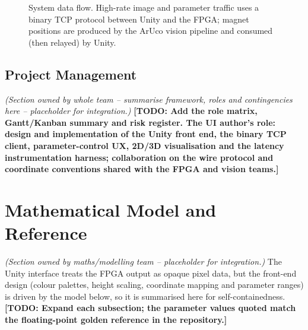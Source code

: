 \documentclass[11pt,a4paper]{article}
\newcommand{\todo}[1]{\textcolor{red!75!black}{\textbf{[TODO: #1]}}}
\newcommand{\owned}[1]{\textit{\small(Section owned by #1 -- placeholder for integration.)}}
\begin{document}
\begin{figure}[t]
\centering
{}
\caption{System data flow. High-rate image and parameter traffic uses a binary
TCP protocol between Unity and the FPGA; magnet positions are produced by the
ArUco vision pipeline and consumed (then relayed) by Unity.}
\label{fig:dataflow}
\end{figure}

\subsection{Project Management}
\owned{whole team -- summarise framework, roles and contingencies here}
\todo{Add the role matrix, Gantt/Kanban summary and risk register. The
UI author's role: design and implementation of the Unity front end, the
binary TCP client, parameter-control UX, 2D/3D visualisation and the latency
instrumentation harness; collaboration on the wire protocol and coordinate
conventions shared with the FPGA and vision teams.}

\section{Mathematical Model and Reference}
\owned{maths/modelling team}
The Unity interface treats the FPGA output as opaque pixel data, but the
front-end design (colour palettes, height scaling, coordinate mapping and
parameter ranges) is driven by the model below, so it is summarised here for
self-containedness. \todo{Expand each subsection; the parameter values quoted
match the floating-point golden reference in the repository.}
\end{document}
